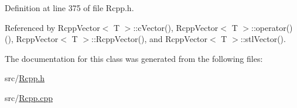 Definition at line 375 of file Rcpp.h.

Referenced by RcppVector$<$ T $>$::cVector(), RcppVector$<$ T $>$::operator()(), RcppVector$<$ T $>$::RcppVector(), and RcppVector$<$ T $>$::stlVector().

The documentation for this class was generated from the following files:\begin{CompactItemize}
\item 
src/\hyperlink{Rcpp_8h}{Rcpp.h}\item 
src/\hyperlink{Rcpp_8cpp}{Rcpp.cpp}\end{CompactItemize}

